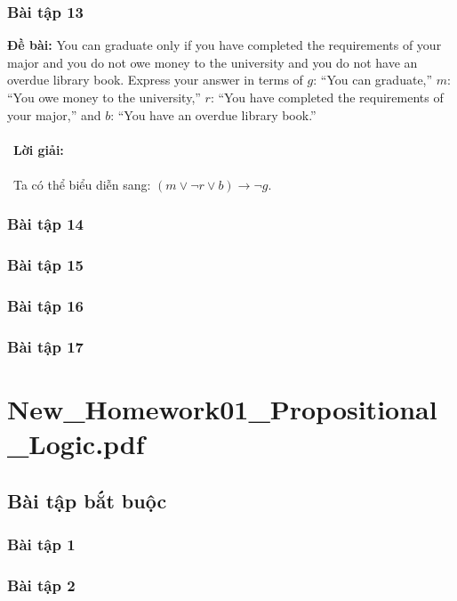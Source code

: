 \documentclass[a4paper]{article}
\begin{document}
\subsubsection{Bài tập 13}
\textbf{Đề bài:} You can graduate only if you have completed the requirements of your major and you do not owe money to the university and you do not have an overdue library book. Express your answer in terms of
$g$: “You can graduate,” $m$: “You owe money to the university,” $r$: “You have completed the requirements
of your major,” and $b$: “You have an overdue library book.” \\\ \\\
\textbf{Lời giải:} \\\ \\\
Ta có thể biểu diễn sang: $(m \lor \lnot r \lor b) \rightarrow \lnot g$.
\clearpage
\subsubsection{Bài tập 14}

\clearpage
\subsubsection{Bài tập 15}

\clearpage
\subsubsection{Bài tập 16}

\clearpage
\subsubsection{Bài tập 17}

\clearpage
\clearpage

\section{New\_Homework01\_Propositional\_Logic.pdf}
\subsection{Bài tập bắt buộc}
\subsubsection{Bài tập 1}

\clearpage
\subsubsection{Bài tập 2}
\end{document}
